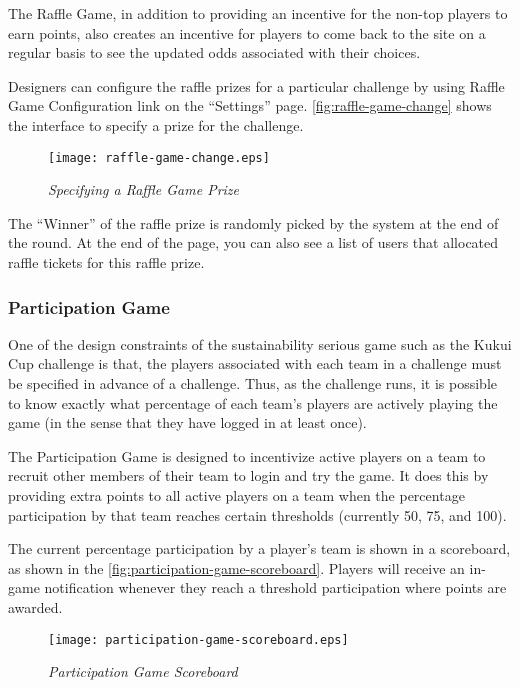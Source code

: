 The Raffle Game, in addition to providing an incentive for the non-top players to earn points, also creates an incentive for players to come back to the site on a regular basis to see the updated odds associated with their choices.

Designers can configure the raffle prizes for a particular challenge by using Raffle Game Configuration link on the ``Settings'' page. \autoref{fig:raffle-game-change} shows the interface to specify a prize for the challenge.

\begin{figure}[!ht]
  \center
  \texttt{[image: raffle-game-change.eps]}
  \caption{\em Specifying a Raffle Game Prize}
  \label{fig:raffle-game-change}
\end{figure}

The ``Winner'' of the raffle prize is randomly picked by the system at the end of the round. At the end of the page, you can also see a list of users that allocated raffle tickets for this raffle prize.

\clearpage

\subsubsection{Participation Game}

One of the design constraints of the sustainability serious game such as the Kukui Cup challenge is that, the players associated with each team in a challenge must be specified in advance of a challenge. Thus, as the challenge runs, it is possible to know exactly what percentage of each team's players are actively playing the game (in the sense that they have logged in at least once).

The Participation Game is designed to incentivize active players on a team to recruit other members of their team to login and try the game. It does this by providing extra points to all active players on a team when the percentage participation by that team reaches certain thresholds (currently 50, 75, and 100).

The current percentage participation by a player's team is shown in a scoreboard, as shown in the \autoref{fig:participation-game-scoreboard}. Players will receive an in-game notification whenever they reach a threshold participation where points are awarded.

\begin{figure}[!ht]
  \center
  \texttt{[image: participation-game-scoreboard.eps]}
  \caption{\em Participation Game Scoreboard}
  \label{fig:participation-game-scoreboard}
\end{figure}


